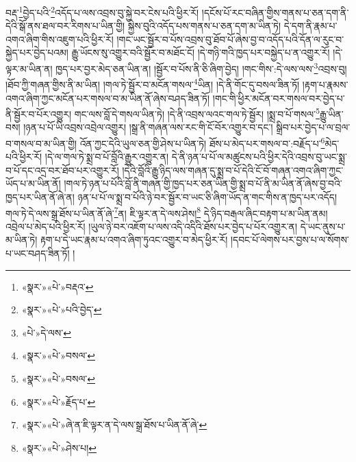 བརྡ་\footnote{«སྣར་»«པེ་»བརྡའ་}བྱེད་པའི་\footnote{«སྣར་»«པེ་»པའི་བྱེད་}འདོད་པ་ལས་འབྲས་བུ་སྐྱེ་བར་ངེས་པའི་ཕྱིར་རོ། །དངོས་པོ་རང་བཞིན་གྱིས་གནས་པ་ཅན་དག་ནི་དེའི་སྒོ་ནས་ཐལ་བར་རིགས་པ་ཡིན་གྱི། སྐྱེས་བུའི་འདོད་པས་གནས་པ་ཅན་དག་མ་ཡིན་ཏེ། དེ་དག་ནི་རྣམ་པ་འགའ་ཞིག་གིས་འཇུག་པའི་ཕྱིར་རོ། །གང་ཡང་སྦྱོར་བ་པོས་འབྲས་བུ་ཐོབ་པོ་ཞེས་བྱ་བ་འདོད་པའི་དོན་ལ་རུང་བ་སྐྱེད་པར་བྱེད་པའམ། རྒྱུ་ཡོངས་སུ་འགྱུར་བའི་སྦྱོར་བ་མཐོང་ངོ། །དེ་གཉི་གའི་ཁྱད་པར་བསྐྱེད་པ་ན་འགྱུར་རོ། །དེ་ལྟར་མ་ཡིན་ན། ཁྱད་པར་བྱར་མེད་ཅན་ཡིན་ན། །སྦྱོར་བ་པོས་ནི་ཅི་ཞིག་བྱེད། །གང་གིས་:དེ་ལས་ལས་\footnote{«པེ་»དེ་ལས་}འབྲས་བུ། །ཐོབ་ཀྱི་གཞན་གྱིས་ནི་མ་ཡིན། །གལ་ཏེ་སྦྱོར་བ་མངོན་གསལ་\footnote{«སྣར་»«པེ་»བསལ་}ཡིན། །དེ་ནི་གོང་དུ་བསལ་ཟིན་ཏོ། །རྟག་པ་རྣམས་འགའ་ཞིག་ཀྱང་མངོན་པར་གསལ་བ་མ་ཡིན་ནོ་ཞེས་བཤད་ཟིན་ཏོ། །གང་གི་ཕྱིར་མངོན་བར་གསལ་བར་བྱེད་པ་ནི་སྦྱོར་བ་པོར་འགྱུར། གང་ལས་བློ་དེ་གསལ་ཡིན་ཏེ། །དེ་ནི་འབྲས་ལའང་གལ་ཏེ་སྦྱོར། །སྨྲ་བ་པོ་གསལ་\footnote{«སྣར་»«པེ་»བསལ་}རྒྱུ་ཡིན་བས། །ཉན་པ་པོ་ཡི་འབྲས་འབྲེལ་འགྱུར། །སྒྲ་ནི་གཞན་ལས་རང་གི་ངོ་བོར་འགྱུར་བ་དང་། སྒྲིབ་པར་བྱེད་པ་ལ་བྲལ་བ་གསལ་བ་མ་ཡིན་གྱི། འོན་ཀྱང་དེའི་ཡུལ་ཅན་གྱི་ཤེས་པ་ཡིན་ཏེ། ཐོས་པ་མེད་པར་གསལ་བ་:བརྗོད་པ་\footnote{«སྣར་»«པེ་»རྗོད་པ་}མེད་པའི་ཕྱིར་རོ། །དེ་ལ་གལ་ཏེ་སྨྲ་བ་པོ་བློའི་རྒྱུར་འགྱུར་ན། དེ་ནི་ཉན་པ་པོ་ལ་མཚུངས་པའི་ཕྱིར་དེའི་འབྲས་བུ་ཡང་སྨྲ་བ་པོ་དང་འདྲ་བར་ཐོབ་པར་འགྱུར་རོ། །དེའི་བློའི་རྒྱུ་ཉིད་ལས་གཞན་དུ་སྨྲ་བ་པོ་དེའི་ངོ་བོ་གཞན་འགའ་ཞིག་ཀྱང་ཡོད་པ་མ་ཡིན་ནོ། །གལ་ཏེ་ཉན་པ་པོའི་བློ་ནི་གཞན་གྱི་ཁྱད་པར་ཅན་ཡིན་གྱི་སྨྲ་བ་པོ་ནི་མ་ཡིན་ནོ་ཞེས་བྱ་བའི་ཁྱད་པར་ཡིན་ནོ་ཞེ་ན། ཉན་པ་པོ་ལ་སྨྲ་བ་པོའི་ཉེ་བར་སྦྱོར་བ་ཡང་ཅི་ཞིག་ཡོད་ན་གང་གིས་ན་ཁྱད་པར་འདོད། གལ་ཏེ་དེ་ལས་སྒྲ་ཐོས་པ་ཡིན་ནོ་ཞེ་\footnote{«སྣར་»«པེ་»ཞེ་ན་ཇི་ལྟར་ན་དེ་ལས་སྒྲ་ཐོས་པ་ཡིན་ནོ་ཞེ་}ན། ཇི་ལྟར་ན་དེ་ལས་ཤེས།\footnote{«སྣར་»«པེ་»ཤེས་པ།} དེ་ཉིད་བརྒལ་ཞིང་བརྟག་པ་མ་ཡིན་ནམ། འབྲེལ་པ་མེད་པའི་ཕྱིར་རོ། །ཡུལ་ཉེ་བར་འཇོག་པ་ལས་འདི་འདིའི་ཐོས་པར་བྱེད་པ་པོར་འགྱུར་ན། དེ་ཡང་ནུས་པ་མ་ཡིན་ཏེ། རྟག་པ་དེ་ཡང་རྣམ་པ་འགའ་ཞིག་ཏུའང་འགྱུར་བ་མེད་ཕྱིར་རོ། །དབང་པོ་ལེགས་པར་བྱས་པ་ལ་སོགས་པ་ཡང་བཤད་ཟིན་ཏོ། །
